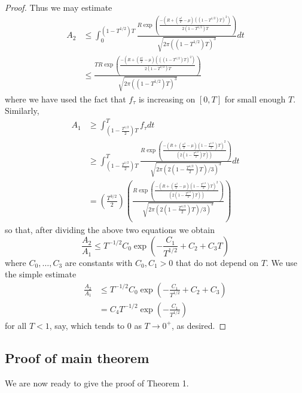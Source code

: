 \documentclass{article}
\theoremstyle{definition}
\theoremstyle{definition}
\begin{document}
\begin{proof}
Thus we may estimate
$$
\begin{aligned}
A_{2} & \leq \int_{0}^{\left(1-T^{1 / 2}\right) T} \frac{R \exp \left(\frac{-\left(R+\left(\frac{\sigma^{2}}{2}-\mu\right)\left(\left(1-T^{1 / 2}\right) T\right)^{2}\right)}{2\left(1-T^{1 / 2}\right) T}\right)}{\sqrt{2 \pi\left(\left(1-T^{1 / 2}\right) T\right)^{3}}} d t \\
& \leq \frac{T R \exp \left(\frac{-\left(R+\left(\frac{\sigma^{2}}{2}-\mu\right)\left(\left(\left(1-T^{1 / 2}\right) T\right)^{2}\right)\right.}{2\left(1-T^{1 / 2}\right) T}\right)}{\sqrt{2 \pi\left(\left(1-T^{1 / 2}\right) T\right)^{3}}}
\end{aligned}
$$
where we have used the fact that $f_{\tau}$ is increasing on $[0, T]$ for small enough $T$. Similarly,
$$
\begin{aligned}
A_{1} & \geq \int_{\left(1-\frac{T^{1 / 2}}{2}\right) T}^{T} f_{\tau} d t \\
& \geq \int_{\left(1-\frac{T^{1 / 2}}{2}\right) T}^{T} \frac{R \exp \left(\frac{-\left(R+\left(\frac{\sigma^{2}}{2}-\mu\right)\left(1-\frac{T^{1 / 2}}{2}\right) T\right)^{2}}{\left.\left(2\left(1-\frac{T^{1 / 2}}{2}\right) T\right)\right)}\right)}{\sqrt{\left.2 \pi\left(2\left(1-\frac{T^{1 / 2}}{2}\right) T\right) / 3\right)^{3}}} d t \\
& =\left(\frac{T^{3 / 2}}{2}\right)\left(\frac{R \exp \left(\frac{-\left(R+\left(\frac{\sigma^{2}}{2}-\mu\right)\left(1-\frac{T^{1 / 2}}{2}\right) T\right)^{2}}{\left.\left(2\left(1-\frac{T^{1 / 2}}{2}\right) T\right)\right)}\right)}{\sqrt{\left.2 \pi\left(2\left(1-\frac{T^{1 / 2}}{2}\right) T\right) / 3\right)^{3}}}\right)
\end{aligned}
$$
so that, after dividing the above two equations we obtain
$$
\frac{A_{2}}{A_{1}} \leq T^{-1 / 2} C_{0} \exp \left(-\frac{C_{1}}{T^{1 / 2}}+C_{2}+C_{3} T\right)
$$
where $C_{0}, \ldots, C_{3}$ are constants with $C_{0}, C_{1}>0$ that do not depend on $T$. We use the simple estimate
$$
\begin{aligned}
\frac{A_{2}}{A_{1}} & \leq T^{-1 / 2} C_{0} \exp \left(-\frac{C_{1}}{T^{1 / 2}}+C_{2}+C_{3}\right) \\
& =C_{4} T^{-1 / 2} \exp \left(-\frac{C_{1}}{T^{1 / 2}}\right)
\end{aligned}
$$
for all $T<1$, say, which tends to 0 as $T \rightarrow 0^{+}$, as desired.
\end{proof}

\subsection{Proof of main theorem}
We are now ready to give the proof of Theorem 1.
\end{document}
